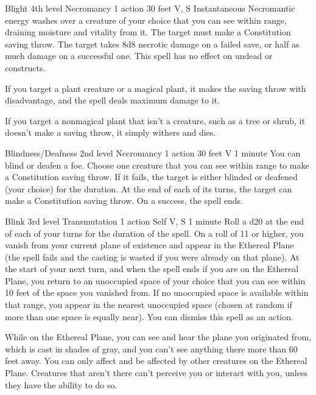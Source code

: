 \documentclass[10pt,a4paper,twoside,bg=print,twocolumn,openany,nodeprecatedcode]{dndbook}
\begin{document}


\DndSpellHeader%
{Blight}
{4th level Necromancy}
{1 action}
{30 feet}
{V, S}
{Instantaneous}
Necromantic energy washes over a creature of your choice that you can see within range, draining moisture and vitality from it. The target must make a Constitution saving throw. The target takes 8d8 necrotic damage on a failed save, or half as much damage on a successful one. This spell has no effect on undead or constructs.

If you target a plant creature or a magical plant, it makes the saving throw with disadvantage, and the spell deals maximum damage to it.

If you target a nonmagical plant that isn't a creature, such as a tree or shrub, it doesn't make a saving throw, it simply withers and dies.



\DndSpellHeader%
{Blindness/Deafness}
{2nd level Necromancy}
{1 action}
{30 feet}
{V}
{1 minute}
You can blind or deafen a foe. Choose one creature that you can see within range to make a Constitution saving throw. If it fails, the target is either blinded or deafened (your choice) for the duration. At the end of each of its turns, the target can make a Constitution saving throw. On a success, the spell ends.



\DndSpellHeader%
{Blink}
{3rd level Transmutation}
{1 action}
{Self}
{V, S}
{1 minute}
Roll a d20 at the end of each of your turns for the duration of the spell. On a roll of 11 or higher, you vanish from your current plane of existence and appear in the Ethereal Plane (the spell fails and the casting is wasted if you were already on that plane). At the start of your next turn, and when the spell ends if you are on the Ethereal Plane, you return to an unoccupied space of your choice that you can see within 10 feet of the space you vanished from. If no unoccupied space is available within that range, you appear in the nearest unoccupied space (chosen at random if more than one space is equally near). You can dismiss this spell as an action.

While on the Ethereal Plane, you can see and hear the plane you originated from, which is cast in shades of gray, and you can't see anything there more than 60 feet away. You can only affect and be affected by other creatures on the Ethereal Plane. Creatures that aren't there can't perceive you or interact with you, unless they have the ability to do so.
\end{document}
